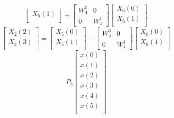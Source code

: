 \documentclass[journal,12pt,twocolumn]{IEEEtran}
\renewcommand\thesection{\arabic{section}}
\begin{document}
\begin{enumerate}[label=\arabic*.,ref=\thesection.\theenumi]
\begin{equation}
\begin{bmatrix}
                     X_{5}(1) \\
                \end{bmatrix}
                +
                \begin{bmatrix}
                     W^{0}_{4} & 0         \\
                     0         & W^{1}_{4}
                \end{bmatrix}
                \begin{bmatrix}
                     X_{6}(0) \\
                     X_{6}(1) \\
                \end{bmatrix}
           \end{equation}
           \begin{equation}
                \begin{bmatrix}
                     X_{2}(2) \\
                     X_{2}(3) \\
                \end{bmatrix}
                =
                \begin{bmatrix}
                     X_{5}(0) \\
                     X_{5}(1) \\
                \end{bmatrix}
                -
                \begin{bmatrix}
                     W^{0}_{4} & 0         \\
                     0         & W^{1}_{4}
                \end{bmatrix}
                \begin{bmatrix}
                     X_{6}(0) \\
                     X_{6}(1) \\
                \end{bmatrix}
           \end{equation}
           \begin{equation}
                P_{8}
                \begin{bmatrix}
                     x(0) \\
                     x(1) \\
                     x(2) \\
                     x(3) \\
                     x(4) \\
                     x(5) \\

\end{bmatrix}
\end{equation}
\end{enumerate}
\end{document}

